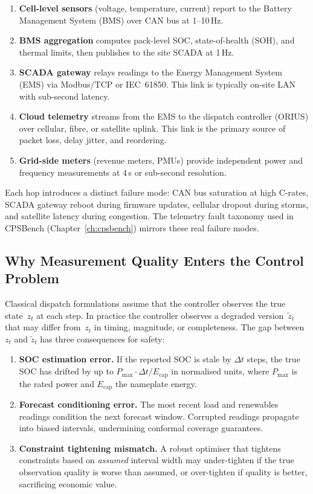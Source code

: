 \begin{enumerate}
  \item \textbf{Cell-level sensors} (voltage, temperature, current) report to
    the Battery Management System (BMS) over CAN bus at 1--10\,Hz.
  \item \textbf{BMS aggregation} computes pack-level SOC, state-of-health
    (SOH), and thermal limits, then publishes to the site SCADA at 1\,Hz.
  \item \textbf{SCADA gateway} relays readings to the Energy Management System
    (EMS) via Modbus/TCP or IEC~61850.  This link is typically on-site LAN
    with sub-second latency.
  \item \textbf{Cloud telemetry} streams from the EMS to the dispatch
    controller (ORIUS) over cellular, fibre, or satellite uplink.  This
    link is the primary source of packet loss, delay jitter, and reordering.
  \item \textbf{Grid-side meters} (revenue meters, PMUs) provide independent
    power and frequency measurements at 4\,s or sub-second resolution.
\end{enumerate}

Each hop introduces a distinct failure mode: CAN bus saturation at high
C-rates, SCADA gateway reboot during firmware updates, cellular dropout during
storms, and satellite latency during congestion.  The telemetry fault taxonomy
used in CPSBench (Chapter~\ref{ch:cpsbench}) mirrors these real failure modes.

\subsection{Why Measurement Quality Enters the Control Problem}

Classical dispatch formulations assume that the controller observes the true
state~$z_t$ at each step.  In practice the controller observes a degraded
version~$\tilde{z}_t$ that may differ from~$z_t$ in timing, magnitude, or
completeness.  The gap between $z_t$ and $\tilde{z}_t$ has three consequences
for safety:

\begin{enumerate}
  \item \textbf{SOC estimation error.}  If the reported SOC is stale by
    $\Delta t$ steps, the true SOC has drifted by up to
    $P_{\max} \cdot \Delta t / E_{\mathrm{cap}}$ in normalised units, where
    $P_{\max}$ is the rated power and $E_{\mathrm{cap}}$ the nameplate energy.
  \item \textbf{Forecast conditioning error.}  The most recent load and
    renewables readings condition the next forecast window.  Corrupted readings
    propagate into biased intervals, undermining conformal coverage guarantees.
  \item \textbf{Constraint tightening mismatch.}  A robust optimiser that
    tightens constraints based on \emph{assumed} interval width may
    under-tighten if the true observation quality is worse than assumed, or
    over-tighten if quality is better, sacrificing economic value.
\end{enumerate}


